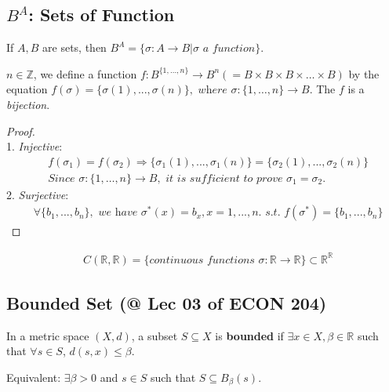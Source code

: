 \documentclass[11pt]{elegantbook}
\begin{document}
\subsection{$B^A$: Sets of Function}
If $A,B$ are sets, then $B^A=\{\sigma:A \rightarrow B| \sigma \textit{ a function}\}$.
\begin{example}
    $n\in \mathbb{Z}$, we define a function $f: B^{\{1,\dots,n\}} \rightarrow B^n(=B\times B\times B\times \dots \times B)$ by the equation
    $f(\sigma)=\{\sigma(1),...,\sigma(n)\}, \textit{ where }\sigma:\{1,\dots,n\} \rightarrow B$. The $f$ is a \textit{bijection}.
\end{example}
\begin{proof}
    \quad\\
    1. \textit{Injective}:
    \begin{equation}
        \begin{aligned}
            &f(\sigma_1)=f(\sigma_2)
            \Rightarrow \{\sigma_1(1),...,\sigma_1(n)\}=\{\sigma_2(1),...,\sigma_2(n)\}\\
            &\textit{Since }\sigma:\{1,\dots,n\} \rightarrow B,\textit{ it is sufficient to prove }\sigma_1=\sigma_2.
        \end{aligned}
        \nonumber
    \end{equation}
    2. \textit{Surjective}:
    \begin{equation}
        \begin{aligned}
            &\forall \{b_1,...,b_n\},\textit{ we have }\sigma^*(x)=b_x,x=1,...,n.\textit{ s.t. }f(\sigma^*)=\{b_1,...,b_n\}
        \end{aligned}
        \nonumber
    \end{equation}

\end{proof}
\begin{example}
    \begin{equation}
        \begin{aligned}
            & C(\mathbb{R},\mathbb{R})=\{\textit{continuous functions }\sigma:\mathbb{R} \rightarrow \mathbb{R} \}\subset \mathbb{R}^\mathbb{R}
        \end{aligned}
        \nonumber
    \end{equation}
\end{example}



\subsection{Bounded Set \small{(@ Lec 03 of ECON 204)}}
\begin{definition}
    \normalfont
    In a metric space $(X, d)$, a subset $S \subseteq X$ is \textbf{bounded} if $\exists x \in X, \beta \in \mathbb{R}$ such that $\forall s \in S$, $d(s, x) \leq \beta$.
\end{definition}
Equivalent: $\exists \beta>0$ and $s\in S$ such that $S\subseteq B_\beta(s)$.
\end{document}
